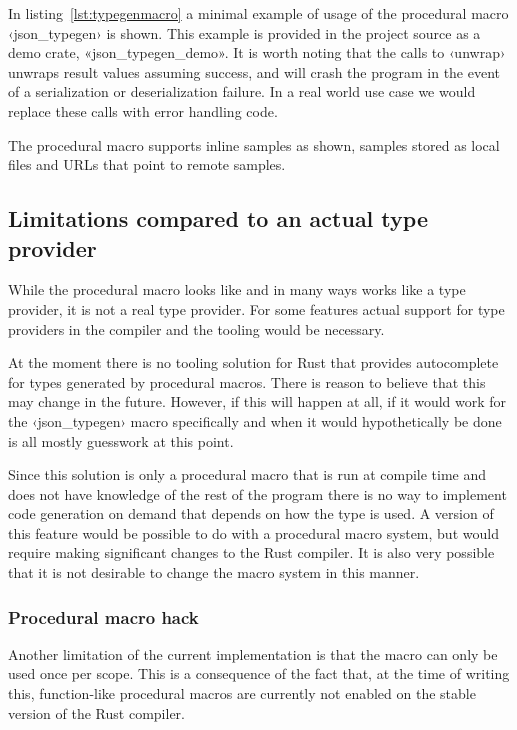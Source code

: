 In listing~\ref{lst:typegenmacro} a minimal example of usage of the procedural macro ‹json_typegen› is shown. This example is provided in the project source as a demo crate, «json_typegen_demo». It is worth noting that the calls to ‹unwrap› unwraps result values assuming success, and will crash the program in the event of a serialization or deserialization failure. In a real world use case we would replace these calls with error handling code.

The procedural macro supports inline samples as shown, samples stored as local files and URLs that point to remote samples.

\subsection{Limitations compared to an actual type provider}
\label{sec:macro-limitations}

While the procedural macro looks like and in many ways works like a type provider, it is not a real type provider. For some features actual support for type providers in the compiler and the tooling would be necessary.

At the moment there is no tooling solution for Rust that provides autocomplete for types generated by procedural macros. There is reason to believe that this may change in the future. However, if this will happen at all, if it would work for the ‹json_typegen› macro specifically and when it would hypothetically be done is all mostly guesswork at this point.

Since this solution is only a procedural macro that is run at compile time and does not have knowledge of the rest of the program there is no way to implement code generation on demand that depends on how the type is used. A version of this feature would be possible to do with a procedural macro system, but would require making significant changes to the Rust compiler. It is also very possible that it is not desirable to change the macro system in this manner.

\subsubsection{Procedural macro hack}

Another limitation of the current implementation is that the macro can only be used once per scope. This is a consequence of the fact that, at the time of writing this, function-like procedural macros are currently not enabled on the stable version of the Rust compiler.

